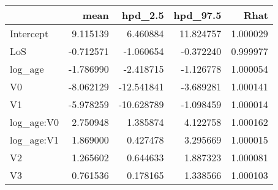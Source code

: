 \begin{tabular}{lrrrr}
\toprule
{} &      mean &    hpd\_2.5 &   hpd\_97.5 &      Rhat \\
\midrule
Intercept  &  9.115139 &   6.460884 &  11.824757 &  1.000029 \\
LoS        & -0.712571 &  -1.060654 &  -0.372240 &  0.999977 \\
log\_age    & -1.786990 &  -2.418715 &  -1.126778 &  1.000054 \\
V0         & -8.062129 & -12.541841 &  -3.689281 &  1.000141 \\
V1         & -5.978259 & -10.628789 &  -1.098459 &  1.000014 \\
log\_age:V0 &  2.750948 &   1.385874 &   4.122758 &  1.000162 \\
log\_age:V1 &  1.869000 &   0.427478 &   3.295669 &  1.000015 \\
V2         &  1.265602 &   0.644633 &   1.887323 &  1.000081 \\
V3         &  0.761536 &   0.178165 &   1.338566 &  1.000103 \\
\bottomrule
\end{tabular}
